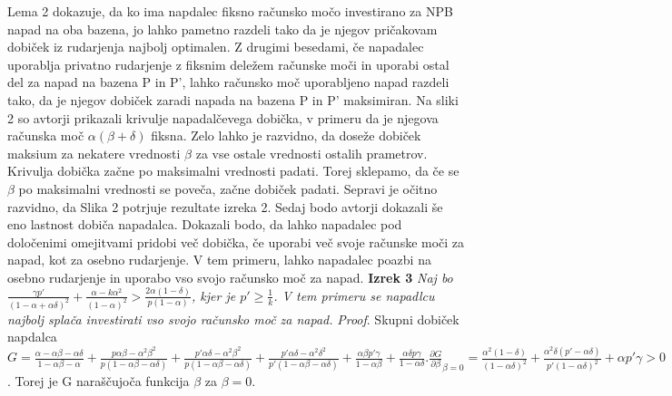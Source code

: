 \documentclass[12pt]{article}
\begin{document}
Lema 2 dokazuje, da ko ima napdalec fiksno računsko močo investirano za NPB napad na oba bazena, jo lahko pametno razdeli tako da je njegov pričakovam dobiček iz rudarjenja najbolj optimalen. Z drugimi besedami, če napadalec uporablja privatno rudarjenje z fiksnim deležem računske moči in uporabi ostal del za napad na bazena P in P', lahko računsko moč uporabljeno napad razdeli tako, da je njegov dobiček zaradi napada na bazena P in P' maksimiran. Na sliki 2 so avtorji prikazali krivulje napadalčevega dobička, v primeru da je njegova računska moč $\alpha(\beta + \delta)$ fiksna. Zelo lahko je razvidno, da doseže dobiček maksium za nekatere vrednosti $\beta$ za vse ostale vrednosti ostalih prametrov. Krivulja dobička začne po maksimalni vrednosti padati. Torej sklepamo, da če se $\beta$ po maksimalni vrednosti se poveča, začne dobiček padati. Sepravi je očitno razvidno, da Slika 2 
potrjuje rezultate izreka 2. Sedaj bodo avtorji dokazali še eno lastnost dobiča napadalca. Dokazali bodo, da lahko napadalec pod določenimi omejitvami pridobi več dobička, če uporabi  več svoje računske moči za napad, kot za osebno rudarjenje. V tem primeru, lahko napadalec poazbi na osebno rudarjenje in uporabo vso svojo računsko moč za napad.
\newline
\newline
\textbf{Izrek 3} \textit{Naj bo $\frac{\gamma p'}{(1 - \alpha + \alpha\delta)^2} + \frac{\alpha - k \alpha^2}{(1 - \alpha)^2} > \frac{2\alpha(1 - \delta)}{p(1 - \alpha)}$, kjer je $p' \geq \frac{1}{k}$. V tem primeru se napadlcu najbolj splača investirati vso svojo računsko moč za napad.}
\newline
\newline
\textit{Proof}. Skupni dobiček napdalca $G = \frac{\alpha - \alpha\beta - \alpha\delta}{1 - \alpha\beta - \alpha} + \frac{p\alpha\beta - \alpha^2\beta^2}{p(1 - \alpha\beta - \alpha\delta)} + \frac{p'\alpha\delta - \alpha^2\beta^2}{p(1 - \alpha\beta - \alpha\delta)} + \frac{p'\alpha\delta - \alpha^2\delta^2}{p'(1- \alpha\beta - \alpha\delta)} + \frac{\alpha\beta p' \gamma}{1 - \alpha\beta} + \frac{\alpha\delta p \gamma}{1 - \alpha\delta}. \frac{\partial G}{\partial \beta}_{\beta=0} = \frac{\alpha^2(1 - \delta)}{(1 - \alpha\delta)^2} + \frac{\alpha^2\delta(p' - \alpha\delta)}{p'(1- \alpha\delta)^2} + \alpha p' \gamma > 0$. Torej je G naraščujoča funkcija $\beta$ za $\beta = 0.$
\end{document}
